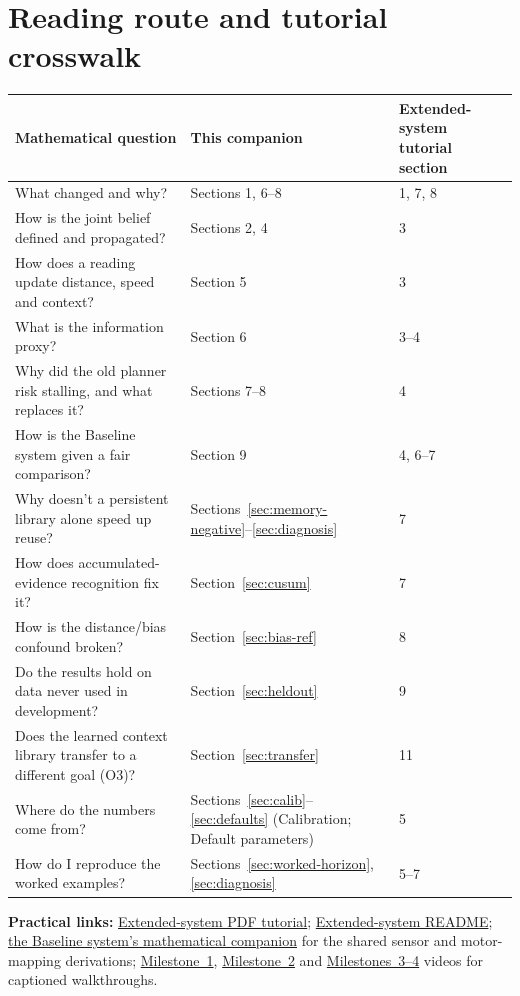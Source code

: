 \documentclass[11pt,a4paper]{article}
\begin{document}
\section{Reading route and tutorial crosswalk}
\begin{longtable}{p{.34\linewidth}p{.20\linewidth}p{.34\linewidth}}
\toprule Mathematical question & This companion & Extended-system tutorial section\\\midrule\endhead
What changed and why? & Sections 1, 6--8 & 1, 7, 8\\
How is the joint belief defined and propagated? & Sections 2, 4 & 3\\
How does a reading update distance, speed and context? & Section 5 & 3\\
What is the information proxy? & Section 6 & 3--4\\
Why did the old planner risk stalling, and what replaces it? & Sections 7--8 & 4\\
How is the Baseline system given a fair comparison? & Section 9 & 4, 6--7\\
Why doesn't a persistent library alone speed up reuse? & Sections~\ref{sec:memory-negative}--\ref{sec:diagnosis} & 7\\
How does accumulated-evidence recognition fix it? & Section~\ref{sec:cusum} & 7\\
How is the distance/bias confound broken? & Section~\ref{sec:bias-ref} & 8\\
Do the results hold on data never used in development? & Section~\ref{sec:heldout} & 9\\
Does the learned context library transfer to a different goal (O3)? & Section~\ref{sec:transfer} & 11\\
Where do the numbers come from? & Sections~\ref{sec:calib}--\ref{sec:defaults} (Calibration; Default parameters) & 5\\
How do I reproduce the worked examples? & Sections~\ref{sec:worked-horizon}, \ref{sec:diagnosis} & 5--7\\
\bottomrule
\end{longtable}
\textbf{Practical links:} \href{Tutorial_EXT1_EN.pdf}{Extended-system PDF tutorial}; \href{README.md}{Extended-system README}; \href{baseline_v1/Mathematical_Model.pdf}{the Baseline system's mathematical companion} for the shared sensor and motor-mapping derivations; \href{Mini_IPHOREOS_EXT1_Video/EXT1_Explanation_EN.mp4}{Milestone~1}, \href{Mini_IPHOREOS_EXT1_Video/EXT1_Memory_Explanation_EN.mp4}{Milestone~2} and \href{Mini_IPHOREOS_EXT1_Video/EXT1_BiasHeldout_Explanation_EN.mp4}{Milestones~3--4} videos for captioned walkthroughs.
\end{document}
